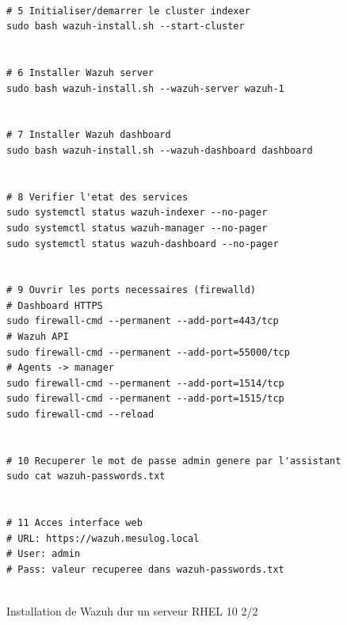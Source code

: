 \documentclass[a4paper, 11pt]{article}
\begin{document}
\begin{figure}[H]
\begin{lstlisting}

# 5 Initialiser/demarrer le cluster indexer
sudo bash wazuh-install.sh --start-cluster


# 6 Installer Wazuh server
sudo bash wazuh-install.sh --wazuh-server wazuh-1


# 7 Installer Wazuh dashboard
sudo bash wazuh-install.sh --wazuh-dashboard dashboard


# 8 Verifier l'etat des services
sudo systemctl status wazuh-indexer --no-pager
sudo systemctl status wazuh-manager --no-pager
sudo systemctl status wazuh-dashboard --no-pager


# 9 Ouvrir les ports necessaires (firewalld)
# Dashboard HTTPS
sudo firewall-cmd --permanent --add-port=443/tcp
# Wazuh API
sudo firewall-cmd --permanent --add-port=55000/tcp
# Agents -> manager
sudo firewall-cmd --permanent --add-port=1514/tcp
sudo firewall-cmd --permanent --add-port=1515/tcp
sudo firewall-cmd --reload


# 10 Recuperer le mot de passe admin genere par l'assistant
sudo cat wazuh-passwords.txt


# 11 Acces interface web
# URL: https://wazuh.mesulog.local
# User: admin
# Pass: valeur recuperee dans wazuh-passwords.txt


\end{lstlisting}
\centering
\caption{Installation de Wazuh dur un serveur RHEL 10 2/2}
  \label{fig:wazuh-install-step2}
\end{figure}






\endgroup
\end{document}
